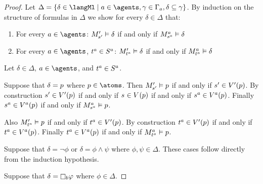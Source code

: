 \begin{proof}

Let $\Delta = \{\delta \in \langMl \mid \agentA \in \agents, \gamma \in \Gamma_\agentA, \delta \subseteq \gamma\}$.
By induction on the structure of formulas in $\Delta$ we show for every $\delta \in \Delta$ that:
\begin{enumerate}
    \item For every $\agentA \in \agents$: $\kPModelP{\kStateSP} \entails \delta$ if and only if $\kPModel[\agentA]{\kStateS[\agentA]} \entails \delta$
    \item For every $\agentA \in \agents$, $\kStateT[\agentA] \in \kStates[\agentA]$: $\kPModelP{\kStateT[\agentA]} \entails \delta$ if and only if $\kPModel[\agentA]{\kStateT[\agentA]} \entails \delta$
\end{enumerate}

Let $\delta \in \Delta$, $\agentA \in \agents$, and $\kStateT[\agentA] \in \kStates[\agentA]$.

Suppose that $\delta = \atomP$ where $\atomP \in \atoms$.
Then $\kPModelP{\kStateSP} \entails \atomP$ if and only if $\kStateSP \in \kValuationP(\atomP)$.
By construction $\kStateSP \in \kValuationP(\atomP)$ if and only if $\kStateS \in \kValuation(\atomP)$ if and only if $\kStateS[\agentA] \in \kValuation[\agentA](\atomP)$.
Finally $\kStateS[\agentA] \in \kValuation[\agentA](\atomP)$ if and only if $\kPModel[\agentA]{\kStateS[\agentA]} \entails \atomP$.

Also $\kPModelP{\kStateT[\agentA]} \entails \atomP$ if and only if $\kStateT[\agentA] \in \kValuationP(\atomP)$.
By construction $\kStateT[\agentA] \in \kValuationP(\atomP)$ if and only if $\kStateT[\agentA] \in \kValuation[\agentA](\atomP)$.
Finally $\kStateT[\agentA] \in \kValuation[\agentA](\atomP)$ if and only if $\kPModel[\agentA]{\kStateT[\agentA]} \entails \atomP$.

Suppose that $\delta = \lnot \phi$ or $\delta = \phi \land \psi$ where $\phi, \psi \in \Delta$.
These cases follow directly from the induction hypothesis.

Suppose that $\delta = \necessaryB \phi$ where $\phi \in \Delta$. 


\end{proof}
